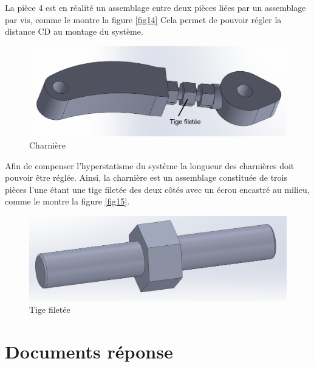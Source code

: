 La pièce 4 est en réalité un assemblage entre deux pièces liées par un assemblage par vis, comme le montre la figure \ref{fig14} Cela permet de pouvoir régler la distance CD au montage du système.

\begin{figure}[!h]
 \centering\includegraphics[width=0.7\linewidth]{img/assemblage}
 \caption{Charnière}
 \label{fig23}
\end{figure}

Afin de compenser l'hyperstatisme du système la longueur des charnières doit pouvoir être réglée. Ainsi, la charnière est un assemblage constituée de trois pièces l'une étant une tige filetée des deux côtés avec un écrou encastré au milieu, comme le montre la figure \ref{fig15}.

\begin{figure}[!h]
 \centering\includegraphics[width=0.6\linewidth]{img/vis}
 \caption{Tige filetée}
 \label{fig24}
\end{figure}




\newpage
\cleardoublepage

\pagestyle{documentreponse}

\section{Documents réponse}

